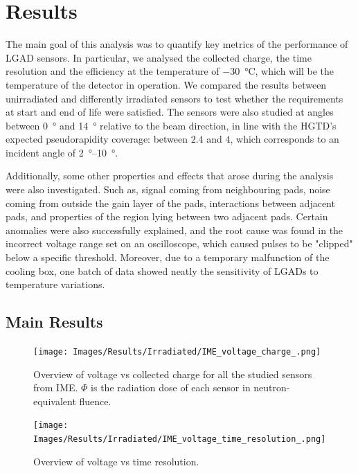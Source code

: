 \chapter{Results}

The main goal of this analysis was to quantify key metrics of the performance of LGAD sensors. In particular, we analysed the collected charge, the time resolution and the efficiency at the temperature of \qty{-30}{\degreeCelsius}, which will be the temperature of the detector in operation. We compared the results between unirradiated and differently irradiated sensors to test whether the requirements at start and end of life were satisfied. The sensors were also studied at angles between \qty{0}{\degree} and \qty{14}{\degree} relative to the beam direction, in line with the HGTD's expected pseudorapidity coverage: between \(2.4\) and \(4\), which corresponds to an incident angle of \qtyrange{2}{10}{\degree}.

Additionally, some other properties and effects that arose during the analysis were also investigated. Such as, signal coming from neighbouring pads, noise coming from outside the gain layer of the pads, interactions between adjacent pads, and properties of the region lying between two adjacent pads. Certain anomalies were also successfully explained, and the root cause was found in the incorrect voltage range set on an oscilloscope, which caused pulses to be "clipped" below a specific threshold. Moreover, due to a temporary malfunction of the cooling box, one batch of data showed neatly the sensitivity of LGADs to temperature variations.

\section{Main Results}

\begin{figure}[h!tbp]
    \centering
    \texttt{[image: Images/Results/Irradiated/IME\_voltage\_charge\_.png]}
    \captionsetup{width=\captionwidth}
    \caption{Overview of voltage vs collected charge for all the studied sensors from IME. \(\Phi\) is the radiation dose of each sensor in neutron-equivalent fluence.}
    \label{fig:irradiated_IME_voltage_charge}
\end{figure}


\begin{figure}[h!tbp]
    \centering
    \texttt{[image: Images/Results/Irradiated/IME\_voltage\_time\_resolution\_.png]}
    \captionsetup{width=\captionwidth}
    \caption{Overview of voltage vs time resolution.}
    \label{fig:irradiated_IME_voltage_time_res}
\end{figure}

